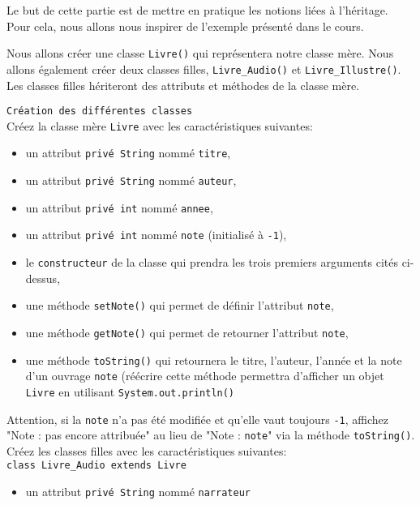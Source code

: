 
Le but de cette partie est de mettre en pratique les notions liées à l'héritage. Pour cela, nous allons nous inspirer de l'exemple présenté dans le cours. 

Nous allons créer une classe \lstinline{Livre()} qui représentera notre classe mère. Nous allons également créer deux classes filles, \lstinline{Livre_Audio()} et \lstinline{Livre_Illustre()}. Les classes filles hériteront des attributs et méthodes de la classe mère. 

\begin{Exercice}[10 minutes] \lstinline{Création des différentes classes}\\
Créez la classe mère \lstinline{Livre} avec les caractéristiques suivantes:
\begin{itemize}
	\item un attribut \lstinline{privé String} nommé \lstinline{titre},
	\item un attribut \lstinline{privé String} nommé \lstinline{auteur},
	\item un attribut \lstinline{privé int} nommé \lstinline{annee},
	\item un attribut \lstinline{privé int} nommé \lstinline{note} (initialisé à \lstinline{-1}),
	\item le \lstinline{constructeur} de la classe qui prendra les trois premiers arguments cités ci-dessus,
	\item une méthode \lstinline{setNote()} qui permet de définir l'attribut \lstinline{note},
	\item une méthode \lstinline{getNote()} qui permet de retourner l'attribut \lstinline{note},
	\item une méthode \lstinline{toString()} qui retournera le titre, l'auteur, l'année et la note d'un ouvrage \lstinline{note} (réécrire cette méthode permettra d'afficher un objet \lstinline{Livre} en utilisant \lstinline{System.out.println()} \\
\end{itemize}

Attention, si la \lstinline{note} n'a pas été modifiée et qu'elle vaut toujours \lstinline{-1}, affichez "Note : pas encore attribuée" au lieu de "Note : \lstinline{note}" via la méthode \lstinline{toString()}. \\


Créez les classes filles avec les caractéristiques suivantes:\\
\lstinline{class Livre_Audio extends Livre}
\begin{itemize}
	\item un attribut \lstinline{privé String} nommé \lstinline{narrateur}


\end{itemize}
\end{Exercice}

